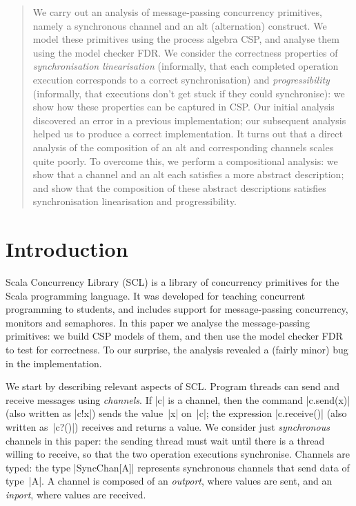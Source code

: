 \begin{abstract}
We carry out an analysis of message-passing concurrency primitives, namely a
synchronous channel and an alt (alternation) construct.  We model these
primitives using the process algebra CSP, and analyse them using the model
checker FDR.  We consider the correctness properties of \emph{synchronisation
  linearisation} (informally, that each completed operation execution
corresponds to a correct synchronisation) and \emph{progressibility}
(informally, that executions don't get stuck if they could synchronise): we
show how these properties can be captured in CSP\@.  Our initial analysis
discovered an error in a previous implementation; our subsequent analysis
helped us to produce a correct implementation.  It turns out that a direct
analysis of the composition of an alt and corresponding channels scales quite
poorly.  To overcome this, we perform a compositional analysis: we show that a
channel and an alt each satisfies a more abstract description; and show that
the composition of these abstract descriptions satisfies synchronisation
linearisation and progressibility.
\end{abstract}


\section{Introduction}

Scala Concurrency Library (SCL) is a library of concurrency primitives for the
Scala programming language.  It was developed for teaching concurrent
programming to students, and includes support for message-passing concurrency,
monitors and semaphores.  In this paper we analyse the message-passing
primitives: we build CSP models of them, and then use the model checker FDR to
test for correctness.  To our surprise, the analysis revealed a (fairly minor)
bug in the implementation.

We start by describing relevant aspects of SCL\@.  Program threads can send
and receive messages using \emph{channels}.  If |c| is a channel, then the
command |c.send(x)| (also written as |c!x|) sends the value~|x| on~|c|; the
expression |c.receive()| (also written as~|c?()|) receives and returns a
value.  We consider just \emph{synchronous} channels in this paper: the
sending thread must wait until there is a thread willing to receive, so that
the two operation executions synchronise.  Channels are typed: the type
|SyncChan[A]| represents synchronous channels that send data of type~|A|.  A
channel is composed of an \emph{outport}, where values are sent, and an
\emph{inport}, where values are received.

